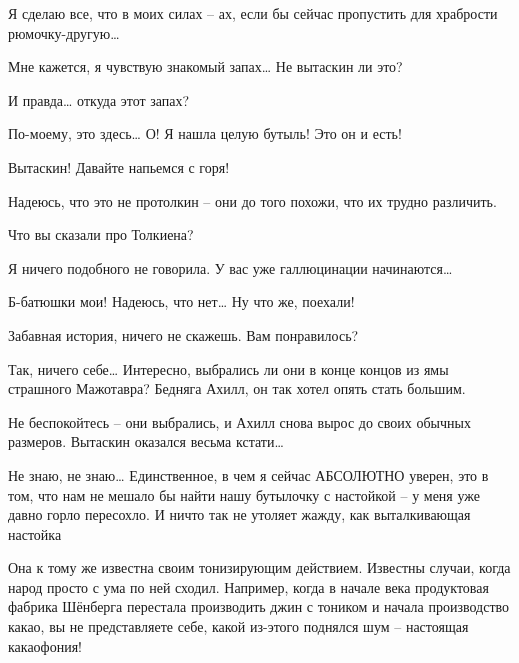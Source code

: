 \documentclass[../main.tex]{subfiles}
\begin{document}
\begin{Dialogue}
\begin{sublevel}
\begin{sublevel}
\begin{sublevel}
 Я сделаю все, что в моих силах \--- ах, если бы сейчас пропустить для храбрости рюмочку-другую\ldots{}

 Мне кажется, я чувствую знакомый запах\ldots{} Не вытаскин ли это?

 И правда\ldots{} откуда этот запах?

 По-моему, это здесь\ldots{} О! Я нашла целую бутыль! Это он и есть!

 Вытаскин! Давайте напьемся с горя!


\begin{customlevel}{0}
     Надеюсь, что это не протолкин \--- они до того похожи, что их трудно различить.
\end{customlevel}

 Что вы сказали про Толкиена?

 Я ничего подобного не говорила. У вас уже галлюцинации начинаются\ldots{}

 Б-батюшки мои! Надеюсь, что нет\ldots{} Ну что же, поехали!


\end{sublevel}

 Забавная история, ничего не скажешь. Вам понравилось?

 Так, ничего себе\ldots{} Интересно, выбрались ли они в конце концов из ямы страшного Мажотавра? Бедняга Ахилл, он так хотел опять стать большим.

 Не беспокойтесь \--- они выбрались, и Ахилл снова вырос до своих обычных размеров. Вытаскин оказался весьма кстати\ldots{}

 Не знаю, не знаю\ldots{} Единственное, в чем я сейчас АБСОЛЮТНО уверен, это в том, что нам не мешало бы найти нашу бутылочку с настойкой \--- у меня уже давно горло пересохло. И ничто так не утоляет жажду, как выталкивающая настойка

 Она к тому же известна своим тонизирующим действием. Известны случаи, когда народ просто с ума по ней сходил. Например, когда в начале века продуктовая фабрика Шёнберга перестала производить джин с тоником и начала производство какао, вы не представляете себе, какой из-этого поднялся шум \--- настоящая какаофония!


\end{sublevel}
\end{sublevel}
\end{Dialogue}
\end{document}
